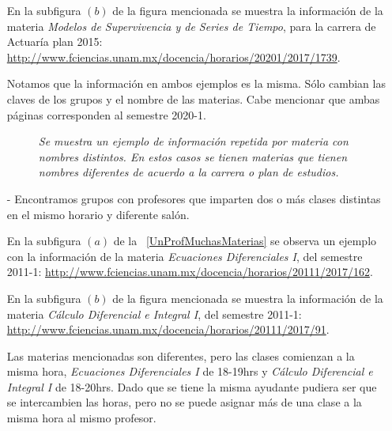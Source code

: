 \begin{itemize}
En la subfigura $(b)$ de la figura mencionada se muestra la información de la materia \textit{Modelos de Supervivencia y de Series de Tiempo}, para la carrera de Actuaría plan 2015: \url{http://www.fciencias.unam.mx/docencia/horarios/20201/2017/1739}.

Notamos que la información en ambos ejemplos es la misma. Sólo cambian las claves de los grupos y el nombre de las materias. Cabe mencionar que ambas páginas corresponden al semestre 2020-1.

\begin{figure}[H]
	\centering
	\caption[\textit{Información repetida: Materia con nombres distintos}]{\textit{Se muestra un ejemplo de información repetida por materia con nombres distintos. En estos casos se tienen materias que tienen nombres diferentes de acuerdo a la carrera o plan de estudios.}}\label{MateriaNombresDistintos}
\end{figure}

\item[-] Encontramos grupos con profesores que imparten dos o más clases distintas en el mismo horario y diferente salón.

En la subfigura $(a)$ de la \figurename{~\ref{UnProfMuchasMaterias}} se observa un ejemplo con la información de la materia \textit{Ecuaciones Diferenciales I}, del semestre 2011-1: \url{http://www.fciencias.unam.mx/docencia/horarios/20111/2017/162}.

En la subfigura $(b)$ de la figura mencionada se muestra la información de la materia \textit{Cálculo Diferencial e Integral I}, del semestre 2011-1: \url{http://www.fciencias.unam.mx/docencia/horarios/20111/2017/91}.

Las materias mencionadas son diferentes, pero las clases comienzan a la misma hora, \textit{Ecuaciones Diferenciales I} de 18-19hrs y \textit{Cálculo Diferencial e Integral I} de 18-20hrs. Dado que se tiene la misma ayudante pudiera ser que se intercambien las horas, pero no se puede asignar más de una clase a la misma hora al mismo profesor.



\end{itemize}
